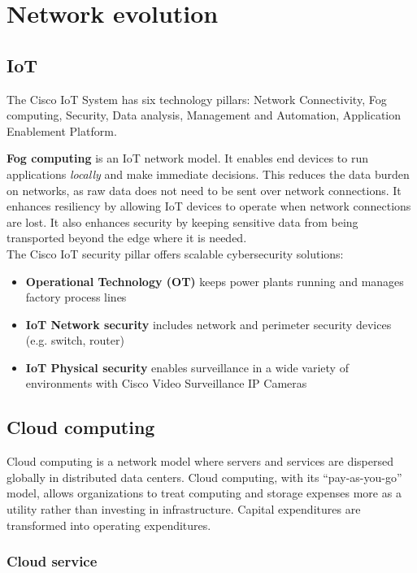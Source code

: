 \chapter{Network evolution}

\section{IoT}

The Cisco IoT System has six technology pillars: Network Connectivity, Fog computing, Security, Data analysis, Management and Automation, Application Enablement Platform.

\textbf{Fog computing} is an IoT network model. It enables end devices to run applications \emph{locally} and make immediate decisions. This reduces the data burden on networks, as raw data does not need to be sent over network connections. It enhances resiliency by allowing IoT devices to operate when network connections are lost. It also enhances security by keeping sensitive data from being transported beyond the edge where it is needed.\\

The Cisco IoT security pillar offers scalable cybersecurity solutions:

\begin{itemize}
\item \textbf{Operational Technology (OT)} keeps power plants running and manages factory process lines
\item \textbf{IoT Network security} includes network and perimeter security devices (e.g. switch, router)
\item \textbf{IoT Physical security} enables surveillance in a wide variety of environments with Cisco Video Surveillance IP Cameras
\end{itemize}

\section{Cloud computing}

Cloud computing is a network model where servers and services are dispersed globally in distributed data centers. Cloud computing, with its ``pay-as-you-go'' model, allows organizations to treat computing and storage expenses more as a utility rather than investing in infrastructure. Capital expenditures are transformed into operating expenditures.

\subsection{Cloud service}

